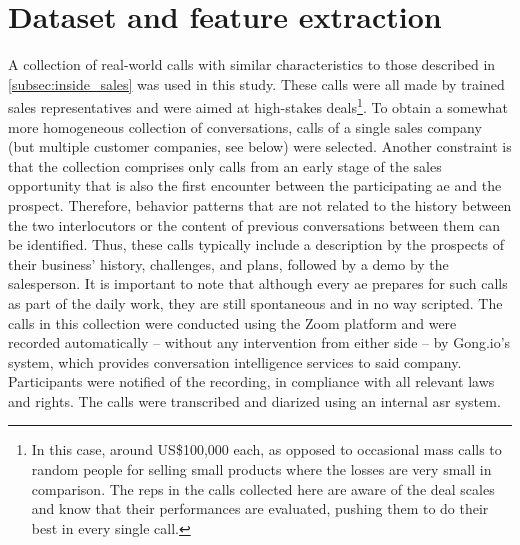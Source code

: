 \section{Dataset and feature extraction}
\label{sec:dataset_calls}

A collection of real-world calls with similar characteristics to those described in \cref{subsec:inside_sales} was used in this study.
These calls were all made by trained sales representatives and were aimed at high-stakes deals\footnote{In this case, around US\$100,000 each, as opposed to occasional mass calls to random people for selling small products where the losses are very small in comparison.
The reps in the calls collected here are aware of the deal scales and know that their performances are evaluated, pushing them to do their best in every single call.}.
To obtain a somewhat more homogeneous collection of conversations, calls of a single sales company (but multiple customer companies, see below) were selected.
Another constraint is that the collection comprises only calls from an early stage of the sales opportunity that is also the first encounter between the participating \ac{ae} and the prospect.
Therefore, behavior patterns that are not related to the history between the two interlocutors or the content of previous conversations between them can be identified.
Thus, these calls typically include a description by the prospects of their business' history, challenges, and plans, followed by a demo by the salesperson.
It is important to note that although every \ac{ae} prepares for such calls as part of the daily work, they are still spontaneous and in no way scripted.
The calls in this collection were conducted using the Zoom platform and were recorded automatically -- without any intervention from either side -- by Gong.io's system, which provides conversation intelligence services to said company.
Participants were notified of the recording, in compliance with all relevant laws and rights.
The calls were transcribed and diarized using an internal \ac{asr} system.

